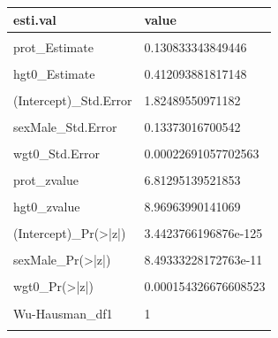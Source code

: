 \documentclass[
]{book}
\begin{document}
\begin{table}[!h]
\centering
\begin{tabular}{l|l}
\hline
esti.val & value\\
\hline
\cellcolor{gray!6}{(Intercept)\_Estimate} & \cellcolor{gray!6}{43.4301969117558}\\
\hline
prot\_Estimate & 0.130833343849446\\
\hline
\cellcolor{gray!6}{sexMale\_Estimate} & \cellcolor{gray!6}{0.868121847262411}\\
\hline
hgt0\_Estimate & 0.412093881817148\\
\hline
\cellcolor{gray!6}{wgt0\_Estimate} & \cellcolor{gray!6}{0.000858630042617921}\\
\hline
(Intercept)\_Std.Error & 1.82489550971182\\
\hline
\cellcolor{gray!6}{prot\_Std.Error} & \cellcolor{gray!6}{0.0192036220809189}\\
\hline
sexMale\_Std.Error & 0.13373016700542\\
\hline
\cellcolor{gray!6}{hgt0\_Std.Error} & \cellcolor{gray!6}{0.0459431912927002}\\
\hline
wgt0\_Std.Error & 0.00022691057702563\\
\hline
\cellcolor{gray!6}{(Intercept)\_zvalue} & \cellcolor{gray!6}{23.798730766023}\\
\hline
prot\_zvalue & 6.81295139521853\\
\hline
\cellcolor{gray!6}{sexMale\_zvalue} & \cellcolor{gray!6}{6.49159323361366}\\
\hline
hgt0\_zvalue & 8.96963990141069\\
\hline
\cellcolor{gray!6}{wgt0\_zvalue} & \cellcolor{gray!6}{3.7840018472164}\\
\hline
(Intercept)\_Pr(>|z|) & 3.4423766196876e-125\\
\hline
\cellcolor{gray!6}{prot\_Pr(>|z|)} & \cellcolor{gray!6}{9.56164541643828e-12}\\
\hline
sexMale\_Pr(>|z|) & 8.49333228172763e-11\\
\hline
\cellcolor{gray!6}{hgt0\_Pr(>|z|)} & \cellcolor{gray!6}{2.97485394526792e-19}\\
\hline
wgt0\_Pr(>|z|) & 0.000154326676608523\\
\hline
\cellcolor{gray!6}{Weakinstruments\_df1} & \cellcolor{gray!6}{1}\\
\hline
Wu-Hausman\_df1 & 1\\
\hline
\cellcolor{gray!6}{Sargan\_df1} & \cellcolor{gray!6}{0}\\

\end{tabular}
\end{table}
\end{document}
